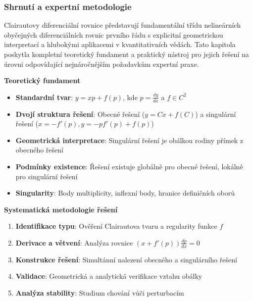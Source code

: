 \subsubsection{Shrnutí a expertní metodologie}
\label{subsec:shrnuti-clairaut}

Clairautovy diferenciální rovnice představují fundamentální třídu nelineárních obyčejných diferenciálních rovnic prvního řádu s explicitní geometrickou interpretací a hlubokými aplikacemi v kvantitativních vědách. Tato kapitola poskytla kompletní teoretický fundament a praktický nástroj pro jejich řešení na úrovni odpovídající nejnáročnějším požadavkům expertní praxe.

\vspace{1\baselineskip}

\noindent\textbf{Teoretický fundament}

\begin{itemize}
\item \textbf{Standardní tvar}: $y = xp + f(p)$, kde $p = \frac{dy}{dx}$ a $f \in C^2$
\item \textbf{Dvojí struktura řešení}: Obecné řešení ($y = Cx + f(C)$) a singulární řešení ($x = -f'(p), y = -pf'(p) + f(p)$)
\item \textbf{Geometrická interpretace}: Singulární řešení je obálkou rodiny přímek z obecného řešení
\item \textbf{Podmínky existence}: Řešení existuje globálně pro obecné řešení, lokálně pro singulární řešení
\item \textbf{Singularity}: Body multiplicity, inflexní body, hranice definičních oborů
\end{itemize}

\vspace{1\baselineskip}

\noindent\textbf{Systematická metodologie řešení}

\begin{enumerate}
\item \textbf{Identifikace typu}: Ověření Clairautova tvaru a regularity funkce $f$
\item \textbf{Derivace a větvení}: Analýza rovnice $(x + f'(p))\frac{dp}{dx} = 0$
\item \textbf{Konstrukce řešení}: Simultánní nalezení obecného a singulárního řešení
\item \textbf{Validace}: Geometrická a analytická verifikace vztahu obálky
\item \textbf{Analýza stability}: Studium chování vůči perturbacím
\end{enumerate}

